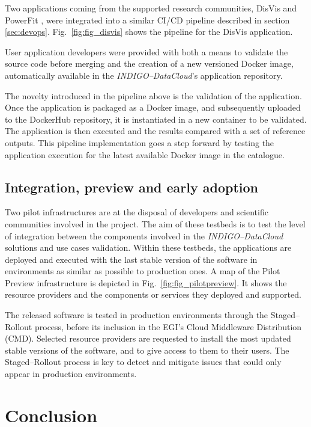 Two applications coming from the supported research communities,
DisVis \cite{disvis} and PowerFit \cite{powerfit}, were
integrated into a similar CI/CD pipeline described in section \ref{sec:devops}.
Fig.~\ref{fig:fig_disvis} shows the pipeline for the DisVis application.

User application developers were provided with both a means to validate the
source code before merging and the creation of a new versioned Docker image,
automatically available in the {\sl INDIGO--DataCloud}'s application repository.

The novelty introduced in the pipeline above is the validation of the application.
Once the application is packaged as a Docker image, and subsequently uploaded
to the DockerHub repository, it is instantiated in a new container to be validated.
The application is then executed and the results compared with a set of reference outputs.
This pipeline implementation goes a step forward by testing the application
execution for the latest available Docker image in the catalogue.

\subsection{Integration, preview and early adoption}

Two pilot infrastructures are at the disposal of developers and scientific
communities involved in the project. The aim of these testbeds is to test the
level of integration between the components involved in the {\sl INDIGO--DataCloud}
solutions and use cases validation. Within these testbeds, the applications are deployed
and executed
with the last stable version of the software in environments as similar as
possible to production ones. A map of the Pilot Preview
infrastructure is depicted in Fig.~\ref{fig:fig_pilotpreview}. It shows the
resource providers and the components or services they deployed and supported.

The released software is tested in production environments through the
Staged--Rollout process, before its inclusion in the EGI's Cloud Middleware Distribution (CMD).
Selected resource providers are requested to install
the most updated stable versions of the software, and to give access to them to their users. The
Staged--Rollout process is key to detect and mitigate issues that could only
appear in production environments.

\section{Conclusion}
\label{sec:con}

